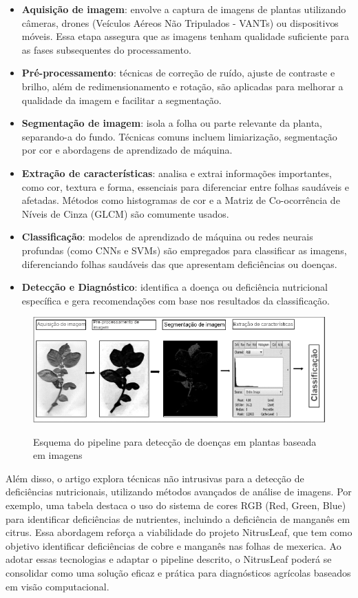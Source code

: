 \begin{itemize}
    \item \textbf{Aquisição de imagem}: envolve a captura de imagens de plantas utilizando câmeras, drones (Veículos Aéreos Não Tripulados - VANTs) ou dispositivos móveis. Essa etapa assegura que as imagens tenham qualidade suficiente para as fases subsequentes do processamento.
    \item \textbf{Pré-processamento}: técnicas de correção de ruído, ajuste de contraste e brilho, além de redimensionamento e rotação, são aplicadas para melhorar a qualidade da imagem e facilitar a segmentação.
    \item \textbf{Segmentação de imagem}: isola a folha ou parte relevante da planta, separando-a do fundo. Técnicas comuns incluem limiarização, segmentação por cor e abordagens de aprendizado de máquina.
    \item \textbf{Extração de características}: analisa e extrai informações importantes, como cor, textura e forma, essenciais para diferenciar entre folhas saudáveis e afetadas. Métodos como histogramas de cor e a Matriz de Co-ocorrência de Níveis de Cinza (GLCM) são comumente usados.
    \item \textbf{Classificação}: modelos de aprendizado de máquina ou redes neurais profundas (como CNNs e SVMs) são empregados para classificar as imagens, diferenciando folhas saudáveis das que apresentam deficiências ou doenças.
    \item \textbf{Detecção e Diagnóstico}: identifica a doença ou deficiência nutricional específica e gera recomendações com base nos resultados da classificação.
\end{itemize}

\begin{figure}[H]
    \centering
    \caption{Esquema do pipeline para detecção de doenças em plantas baseada em imagens}
    \includegraphics[width=0.8\linewidth]{Illustrations/pipeline.png}
    \label{fig:pipeline}
    \end{figure}


Além disso, o artigo explora técnicas não intrusivas para a detecção de deficiências nutricionais, utilizando métodos avançados de análise de imagens. Por exemplo, uma tabela destaca o uso do sistema de cores RGB (Red, Green, Blue) para identificar deficiências de nutrientes, incluindo a deficiência de manganês em citrus. Essa abordagem reforça a viabilidade do projeto NitrusLeaf, que tem como objetivo identificar deficiências de cobre e manganês nas folhas de mexerica. Ao adotar essas tecnologias e adaptar o pipeline descrito, o NitrusLeaf poderá se consolidar como uma solução eficaz e prática para diagnósticos agrícolas baseados em visão computacional.



